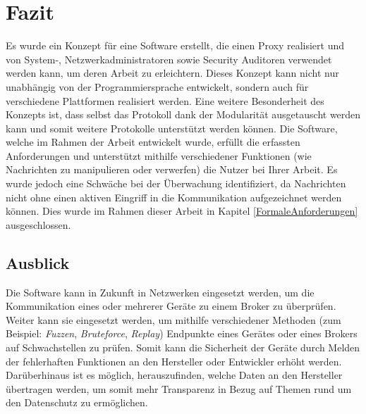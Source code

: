 \chapter{Fazit}
Es wurde ein Konzept für eine Software erstellt, die einen Proxy realisiert und von System-, Netzwerkadministratoren sowie Security Auditoren verwendet werden kann, um deren Arbeit zu erleichtern. Dieses Konzept kann nicht nur unabhängig von der Programmiersprache entwickelt, sondern auch für verschiedene Plattformen realisiert werden. Eine weitere Besonderheit des Konzepts ist, dass selbst das Protokoll dank der Modularität ausgetauscht werden kann und somit weitere Protokolle unterstützt werden können.
Die Software, welche im Rahmen der Arbeit entwickelt wurde, erfüllt die erfassten Anforderungen und unterstützt mithilfe verschiedener Funktionen (wie Nachrichten zu manipulieren oder verwerfen) die Nutzer bei Ihrer Arbeit. Es wurde jedoch eine Schwäche bei der Überwachung identifiziert, da Nachrichten nicht ohne einen aktiven Eingriff in die Kommunikation aufgezeichnet werden können. Dies wurde im Rahmen dieser Arbeit in Kapitel \ref{FormaleAnforderungen} ausgeschlossen.


\section{Ausblick}
Die Software kann in Zukunft in Netzwerken eingesetzt werden, um die Kommunikation eines oder mehrerer Geräte zu einem Broker zu überprüfen.
Weiter kann sie eingesetzt werden, um mithilfe verschiedener Methoden (zum Beispiel: \emph{Fuzzen}, \emph{Bruteforce}, \emph{Replay}) Endpunkte eines Gerätes oder eines Brokers auf Schwachstellen zu prüfen. Somit kann die Sicherheit der Geräte durch Melden der fehlerhaften Funktionen an den Hersteller oder Entwickler erhöht werden. Darüberhinaus ist es möglich, herauszufinden, welche Daten an den Hersteller übertragen werden, um somit mehr Transparenz in Bezug auf Themen rund um den Datenschutz zu ermöglichen. %

